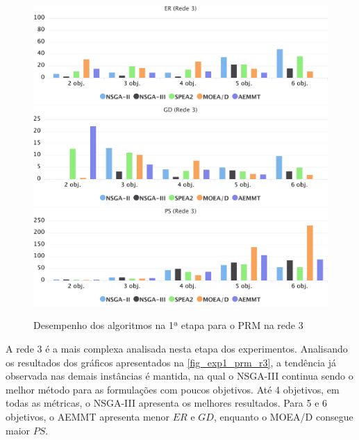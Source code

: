 \begin{figure}[!htbp]
	\includegraphics[width=1\textwidth]{cap_experimentos/figs/etapa1/er-mrp-r3}
	\includegraphics[width=1\textwidth]{cap_experimentos/figs/etapa1/gd-mrp-r3}
	\includegraphics[width=1\textwidth]{cap_experimentos/figs/etapa1/ps-mrp-r3}
	\caption{\label{fig_exp1_prm_r3}Desempenho dos algoritmos na 1ª etapa para o PRM na rede 3}
\end{figure}

A rede 3 é a mais complexa analisada nesta etapa dos experimentos. Analisando os resultados dos gráficos apresentados na \autoref{fig_exp1_prm_r3}, a tendência já observada nas demais instâncias é mantida, na qual o NSGA-III continua sendo o melhor método para as formulações com poucos objetivos. Até 4 objetivos, em todas as métricas, o NSGA-III apresenta os melhores resultados. Para 5 e 6 objetivos, o AEMMT apresenta menor $ER$ e $GD$, enquanto o MOEA/D consegue maior $PS$.

